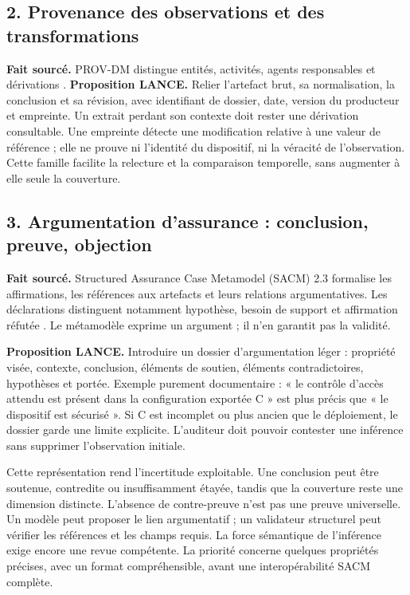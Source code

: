 \documentclass[11pt,a4paper]{article}
\begin{document}
\subsection*{2. Provenance des observations et des transformations}
\textbf{Fait sourcé.} PROV-DM distingue entités, activités, agents responsables et dérivations \cite{prov}. \textbf{Proposition LANCE.} Relier l'artefact brut, sa normalisation, la conclusion et sa révision, avec identifiant de dossier, date, version du producteur et empreinte. Un extrait perdant son contexte doit rester une dérivation consultable. Une empreinte détecte une modification relative à une valeur de référence ; elle ne prouve ni l'identité du dispositif, ni la véracité de l'observation. Cette famille facilite la relecture et la comparaison temporelle, sans augmenter à elle seule la couverture.

\newpage
\subsection*{3. Argumentation d'assurance : conclusion, preuve, objection}
\textbf{Fait sourcé.} Structured Assurance Case Metamodel (SACM) 2.3 formalise les affirmations, les références aux artefacts et leurs relations argumentatives. Les déclarations distinguent notamment hypothèse, besoin de support et affirmation réfutée \cite{sacm}. Le métamodèle exprime un argument ; il n'en garantit pas la validité.

\textbf{Proposition LANCE.} Introduire un dossier d'argumentation léger : propriété visée, contexte, conclusion, éléments de soutien, éléments contradictoires, hypothèses et portée. Exemple purement documentaire : « le contrôle d'accès attendu est présent dans la configuration exportée C » est plus précis que « le dispositif est sécurisé ». Si C est incomplet ou plus ancien que le déploiement, le dossier garde une limite explicite. L'auditeur doit pouvoir contester une inférence sans supprimer l'observation initiale.

Cette représentation rend l'incertitude exploitable. Une conclusion peut être soutenue, contredite ou insuffisamment étayée, tandis que la couverture reste une dimension distincte. L'absence de contre-preuve n'est pas une preuve universelle. Un modèle peut proposer le lien argumentatif ; un validateur structurel peut vérifier les références et les champs requis. La force sémantique de l'inférence exige encore une revue compétente. La priorité concerne quelques propriétés précises, avec un format compréhensible, avant une interopérabilité SACM complète.
\end{document}
